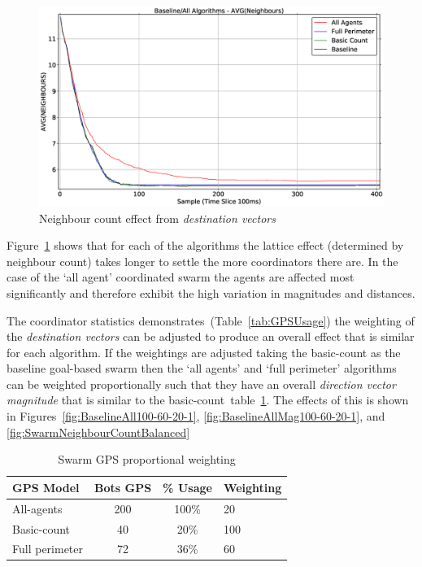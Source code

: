 \begin{figure}[H]
\begin{center}
\includegraphics[width=14cm]{CHAPTER-6/figures/SwarmNeighbourCount}
\end{center}
\caption{Neighbour count effect from \textit{destination vectors}\label{fig:SwarmNeighbourCount}}
\end{figure}

Figure~\ref{fig:SwarmNeighbourCount} shows that for each of the algorithms the lattice effect (determined by neighbour count) takes longer to settle the more coordinators there are. In the case of the `all agent' coordinated swarm the agents are affected most significantly and therefore exhibit the high variation in magnitudes and distances.

The coordinator statistics demonstrates~(Table~\ref{tab:GPSUsage}) the weighting of the \textit{destination vectors} can be adjusted to produce an overall effect that is similar for each algorithm. If the weightings are adjusted taking the basic-count as the baseline goal-based swarm then the `all agents' and `full perimeter' algorithms can be weighted proportionally such that they have an overall \textit{direction vector magnitude} that is similar to the basic-count~table~\ref{tab:GPSWeighting}. The effects of this is shown in Figures~\ref{fig:BaselineAll100-60-20-1}, \ref{fig:BaselineAllMag100-60-20-1}, and \ref{fig:SwarmNeighbourCountBalanced}

\begin{table}[H]
\begin{center}
\begin{tabular}{| l | c | c | l |}
\hline
GPS Model & Bots GPS & \% Usage & Weighting \\ \hline
All-agents & 200 & 100\% & 20 \\ \hline
Basic-count & 40 & 20\% & 100 \\ \hline
Full perimeter & 72 & 36\% & 60 \\  \hline
\end{tabular}\caption{Swarm GPS proportional weighting}\label{tab:GPSWeighting}
\end{center}
\end{table}

